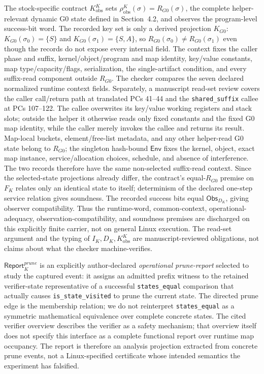 \documentclass[conference]{IEEEtran}
\begin{document}
The stock-specific contract $K^K_{\mathrm{obs}}$ sets $\rho^K_{\mathrm{obs}}(\sigma)=R_{G0}(\sigma)$, the complete helper-relevant dynamic G0 state defined in Section~4.2, and observes the program-level success-bit word. The recorded key set is only a derived projection $K_{G0}$: $K_{G0}(\sigma_0)=\{S\}$ and $K_{G0}(\sigma_1)=\{S,A\}$, so $R_{G0}(\sigma_0)\ne R_{G0}(\sigma_1)$ even though the records do not expose every internal field. The context fixes the caller phase and suffix, kernel/object/program and map identity, key/value constants, map type/capacity/flags, serialization, the single-artifact condition, and every suffix-read component outside $R_{G0}$. The checker compares the seven declared normalized runtime context fields. Separately, a manuscript read-set review covers the caller call/return path at translated PCs 41--44 and the \texttt{shared\_suffix} callee at PCs 107--122. The callee overwrites its key/value working registers and stack slots; outside the helper it otherwise reads only fixed constants and the fixed G0 map identity, while the caller merely invokes the callee and returns its result. Map-local buckets, element/free-list metadata, and any other helper-read G0 state belong to $R_{G0}$; the singleton hash-bound $\mathsf{Env}$ fixes the kernel, object, exact map instance, service/allocation choices, schedule, and absence of interference. The two records therefore have the same non-selected suffix-read context. Since the selected-state projections already differ, the contract's equal-$R_{G0}$ premise on $F_K$ relates only an identical state to itself; determinism of the declared one-step service relation gives soundness. The recorded success bits equal $\mathsf{Obs}_{D_K}$, giving observer compatibility. Thus the runtime-word, common-context, operational-adequacy, observation-compatibility, and soundness premises are discharged on this explicitly finite carrier, not on general Linux execution. The read-set argument and the typing of $I_K,D_K,K^K_{\mathrm{obs}}$ are manuscript-reviewed obligations, not claims about what the checker machine-verifies.

$\mathsf{Report}^{\mathit{prune}}_K$ is an explicitly author-declared \emph{operational prune-report} selected to study the captured event: it assigns an admitted prefix witness to the retained verifier-state representative of a successful \texttt{states\_equal} comparison that actually causes \texttt{is\_state\_visited} to prune the current state. The directed prune edge is the membership relation; we do not reinterpret \texttt{states\_equal} as a symmetric mathematical equivalence over complete concrete states. The cited verifier overview describes the verifier as a safety mechanism; that overview itself does not specify this interface as a complete functional report over runtime map occupancy. The report is therefore an analysis projection extracted from concrete prune events, not a Linux-specified certificate whose intended semantics the experiment has falsified.
\end{document}

